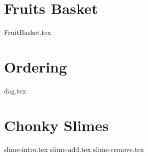 \documentclass[11pt]{exam}
\begin{document}

\section{Fruits Basket}
\begin{questions}
{FruitBasket.tex}
\end{questions}



\section{Ordering}
\begin{questions}
{dag.tex}
\end{questions}
\pagebreak



\section{Chonky Slimes}
\begin{questions}
{slime-intro.tex}
{slime-add.tex}
{slime-remove.tex}
\end{questions}
\end{document}

